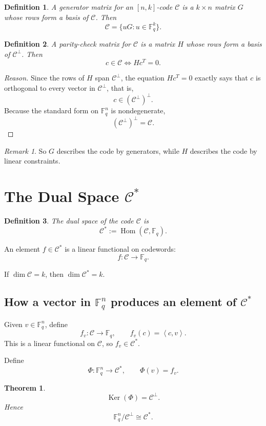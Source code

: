 \documentclass[11pt]{article}
\newtheorem{definition}{Definition}
\newtheorem{theorem}{Theorem}
\theoremstyle{remark}
\newtheorem{remark}{Remark}
\newcommand{\F}{\mathbb{F}}
\newcommand{\C}{\mathcal{C}}
\newcommand{\Cp}{\mathcal{C}^{\perp}}
\newcommand{\ip}[2]{\left\langle #1,#2\right\rangle}
\newcommand{\Hom}{\operatorname{Hom}}
\newcommand{\Ker}{\operatorname{Ker}}
\begin{document}
	\begin{definition}
		A \emph{generator matrix} for an \([n,k]\)-code \(\C\) is a \(k\times n\) matrix \(G\) whose rows form a basis of \(\C\). Then
		\[
		\C = \{uG : u\in \F_q^k\}.
		\]
	\end{definition}
	
	\begin{definition}
		A \emph{parity-check matrix} for \(\C\) is a matrix \(H\) whose rows form a basis of \(\Cp\). Then
		\[
		c\in \C \iff Hc^T=0.
		\]
	\end{definition}
	
	\begin{proof}[Reason]
		Since the rows of \(H\) span \(\Cp\), the equation \(Hc^T=0\) exactly says that \(c\) is orthogonal to every vector in \(\Cp\), that is,
		\[
		c\in (\Cp)^\perp.
		\]
		Because the standard form on \(\F_q^n\) is nondegenerate,
		\[
		(\Cp)^\perp=\C.
		\]
	\end{proof}
	
	\begin{remark}
		So \(G\) describes the code by generators, while \(H\) describes the code by linear constraints.
	\end{remark}
	
	\section{The Dual Space \(\C^*\)}
	
	\begin{definition}
		The dual space of the code \(\C\) is
		\[
		\C^*:=\Hom(\C,\F_q).
		\]
	\end{definition}
	
	An element \(f\in \C^*\) is a linear functional on codewords:
	\[
	f:\C\to \F_q.
	\]
	
	If \(\dim \C=k\), then \(\dim \C^*=k\).
	
	\subsection{How a vector in \(\F_q^n\) produces an element of \(\C^*\)}
	
	Given \(v\in \F_q^n\), define
	\[
	f_v:\C\to \F_q,\qquad f_v(c)=\ip{c}{v}.
	\]
	This is a linear functional on \(\C\), so \(f_v\in \C^*\).
	
	Define
	\[
	\Phi:\F_q^n\to \C^*,\qquad \Phi(v)=f_v.
	\]
	
	\begin{theorem}
		\[
		\Ker(\Phi)=\Cp.
		\]
		Hence
		\[
		\F_q^n/\Cp \cong \C^*.
		\]
	\end{theorem}
	
\end{document}
